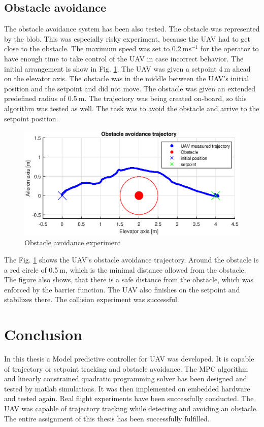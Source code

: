 \documentclass[a4paper,11pt,titlepage]{article}
\newcommand{\jed}[1]{\ensuremath{~\mathrm{#1}}}
\begin{document}
\subsection{Obstacle avoidance}
The obstacle avoidance system has been also tested. The obstacle was represented by the blob. This was especially risky experiment, because the UAV had to get close to the obstacle. The maximum speed was set to 0.2\jed{ms^{-1}} for the operator to have enough time to take control of the UAV in case incorrect behavior. The initial arrangement is show in Fig. \ref{fig:avoidance_experiment}. The UAV was given a setpoint 4\jed{m} ahead on the elevator axis. The obstacle was in the middle between the UAV's initial position and the setpoint and did not move. The obstacle was given an extended predefined radius of 0.5\jed{m}. The trajectory was being created on-board, so this algorithm was tested as well. The task was to avoid the obstacle and arrive to the setpoint position.

\begin{figure}[h]
\centering
\includegraphics[width=1\textwidth]{fig/avoidance_experiment.eps}
\caption{Obstacle avoidance experiment}
\label{fig:avoidance_experiment}
\end{figure}

The Fig. \ref{fig:avoidance_experiment} shows the UAV's obstacle avoidance trajectory. Around the obstacle is a red circle of 0.5\jed{m}, which is the minimal distance allowed from the obstacle. The figure also shows, that there is a safe distance from the obstacle, which was enforced by the barrier function. The UAV also finishes on the setpoint and stabilizes there. The collision experiment was successful.

\section{Conclusion}
In this thesis a Model predictive controller for UAV was developed. It is capable of trajectory or setpoint tracking and obstacle avoidance. The MPC algorithm and linearly constrained quadratic programming solver has been designed and tested by matlab simulations. It was then implemented on embedded hardware and tested again. Real flight experiments have been successfully conducted. The UAV was capable of trajectory tracking while detecting and avoiding an obstacle. The entire assignment of this thesis has been successfully fulfilled.
\end{document}

